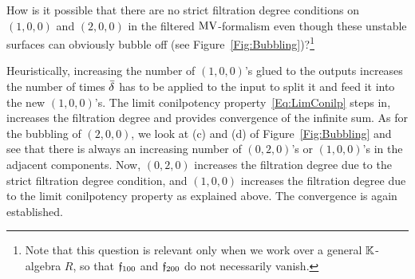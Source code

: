 \documentclass[\MainFolder/Text.tex]{subfiles}
\begin{document}
\begin{Example}\label{Ex:AsymOfMV}
How is it possible that there are no strict filtration degree conditions on $(1,0,0)$ and $(2,0,0)$ in the filtered $\mathrm{MV}$-formalism even though these unstable surfaces can obviously bubble off (see Figure~\ref{Fig:Bubbling})?\footnote{Note that this question is relevant only when we work over a general $\mathbb{K}$-algebra $R$, so that $\mathfrak{f}_{100}$ and $\mathfrak{f}_{200}$ do not necessarily vanish.}

Heuristically, increasing the number of $(1,0,0)$'s glued to the outputs increases the number of times $\bar{\delta}$ has to be applied to the input to split it and feed it into the new $(1,0,0)$'s. The limit conilpotency property~\eqref{Eq:LimConilp} steps in, increases the filtration degree and provides convergence of the infinite sum. As for the bubbling of $(2,0,0)$, we look at (c) and (d) of Figure~\ref{Fig:Bubbling} and see that there is always an increasing  number of $(0,2,0)$'s or $(1,0,0)$'s in the adjacent components. Now, $(0,2,0)$ increases the filtration degree due to the strict filtration degree condition, and $(1,0,0)$ increases the filtration degree due to the limit conilpotency property as explained above. The convergence is again established.


\end{Example}
\end{document}
